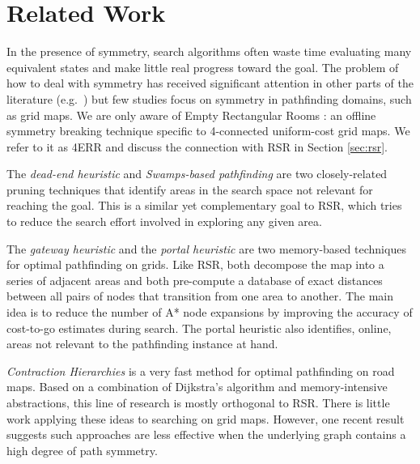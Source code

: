 \section{Related Work}
\label{sec:relatedwork}
In the presence of symmetry, search algorithms often
waste time evaluating many equivalent states and make little real progress toward the goal.
The problem of how to deal with symmetry has received significant attention
in other parts of the literature (e.g.~\cite{rossi06}) but few studies
focus on symmetry in pathfinding domains, such as grid maps.
We are only aware of Empty Rectangular Rooms \cite{harabor10}: an offline symmetry 
breaking technique specific to 4-connected uniform-cost grid maps. We refer to
it as 4ERR and discuss the connection with RSR in Section \ref{sec:rsr}.
\par
The \emph{dead-end heuristic} \cite{bjornsson06} and \emph{Swamps-based
pathfinding} \cite{pochter10} are two closely-related pruning techniques
that identify areas in the search space not relevant for reaching the goal. 
This is a similar yet complementary goal
to RSR, which tries to reduce the search effort involved in exploring any given
area. 
\par
The \emph{gateway heuristic} \cite{bjornsson06} and the \emph{portal heuristic}
\cite{goldenberg10} are two memory-based techniques for optimal
pathfinding on grids. 
Like RSR, both decompose the map into a series of adjacent areas and both
pre-compute a database of exact distances between all pairs of nodes that
transition from one area to another.  The main idea is to reduce the number of
A* node expansions by improving the accuracy of cost-to-go estimates during
search.  The portal heuristic also identifies, online, areas
not relevant to the pathfinding instance at hand.
\par
\emph{Contraction Hierarchies} \cite{geisberger08} is a very fast method for
optimal pathfinding on road maps. 
Based on a combination of Dijkstra's algorithm and memory-intensive
abstractions, this line of research is mostly orthogonal to RSR.
There is little work applying these ideas to searching on grid maps.
However, one recent result \cite{sturtevant10} suggests such approaches
are less effective when the underlying graph contains a high degree of path
symmetry.
